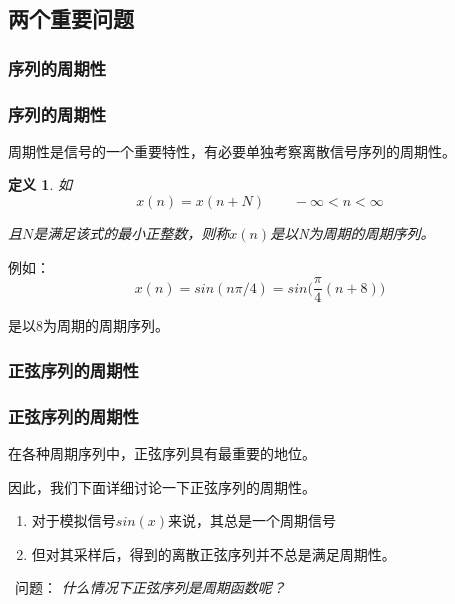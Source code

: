 \documentclass[notheorems,compress,mathserif,table]{beamer}
\newtheorem{definition}{定义}
\begin{document}
\subsection{两个重要问题}
\subsubsection*{序列的周期性}
\begin{frame}[shrink]\frametitle{序列的周期性}%


周期性是信号的一个重要特性，有必要单独考察离散信号序列的周期性。
\begin{definition}
如
\begin{equation*}
    x(n) = x(n+N)\quad\quad  -\infty <n<\infty
\end{equation*}


且$N$是满足该式的最小正整数，则称$x(n)$是以N为周期的周期序列。
\end{definition}

例如：$$x(n) = sin(n\pi/4) = sin\Big(\frac{\pi}{4}(n+8)\Big)$$

   是以8为周期的周期序列。
\end{frame}



\subsubsection*{正弦序列的周期性}

\begin{frame}\frametitle{正弦序列的周期性}%
在各种周期序列中，正弦序列具有最重要的地位。

因此，我们下面详细讨论一下正弦序列的周期性。


\begin{enumerate}
  \item 对于模拟信号$sin(x)$来说，其总是一个周期信号
  \item 但对其采样后，得到的离散正弦序列并不总是满足周期性。
\end{enumerate}
\quad\newline\newline\quad\
问题：
\emph{什么情况下正弦序列是周期函数呢？}
\end{frame}
\end{document}

